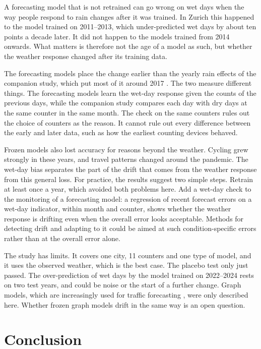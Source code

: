 \documentclass[preprint,12pt,authoryear]{elsarticle}
\begin{document}
A forecasting model that is not retrained can go wrong on wet days when the way people respond to rain changes after it was trained. In Zurich this happened to the model trained on 2011--2013, which under-predicted wet days by about ten points a decade later. It did not happen to the models trained from 2014 onwards. What matters is therefore not the age of a model as such, but whether the weather response changed after its training data.

The forecasting models place the change earlier than the yearly rain effects of the companion study, which put most of it around 2017 \citep{arzimanli2026rain}. The two measure different things. The forecasting models learn the wet-day response given the counts of the previous days, while the companion study compares each day with dry days at the same counter in the same month. The check on the same counters rules out the choice of counters as the reason. It cannot rule out every difference between the early and later data, such as how the earliest counting devices behaved.

Frozen models also lost accuracy for reasons beyond the weather. Cycling grew strongly in these years, and travel patterns changed around the pandemic. The wet-day bias separates the part of the drift that comes from the weather response from this general loss. For practice, the results suggest two simple steps. Retrain at least once a year, which avoided both problems here. Add a wet-day check to the monitoring of a forecasting model: a regression of recent forecast errors on a wet-day indicator, within month and counter, shows whether the weather response is drifting even when the overall error looks acceptable. Methods for detecting drift and adapting to it \citep{alippi2013just,ditzler2015learning,gama2014survey} could be aimed at such condition-specific errors rather than at the overall error alone.

The study has limits. It covers one city, 11 counters and one type of model, and it uses the observed weather, which is the best case. The placebo test only just passed. The over-prediction of wet days by the model trained on 2022--2024 rests on two test years, and could be noise or the start of a further change. Graph models, which are increasingly used for traffic forecasting \citep{cini2025graph}, were only described here. Whether frozen graph models drift in the same way is an open question.

\section{Conclusion}
\end{document}
